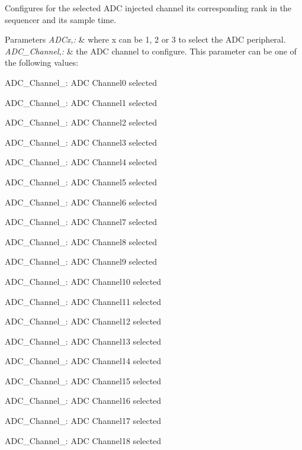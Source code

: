 Configures for the selected A\-D\-C injected channel its corresponding rank in the sequencer and its sample time. 


\begin{DoxyParams}{Parameters}
{\em A\-D\-Cx,\-:} & where x can be 1, 2 or 3 to select the A\-D\-C peripheral. \\
\hline
{\em A\-D\-C\-\_\-\-Channel,\-:} & the A\-D\-C channel to configure. This parameter can be one of the following values\-: \begin{DoxyItemize}
\item A\-D\-C\-\_\-\-Channel\-\_\-: A\-D\-C Channel0 selected \item A\-D\-C\-\_\-\-Channel\-\_\-: A\-D\-C Channel1 selected \item A\-D\-C\-\_\-\-Channel\-\_\-: A\-D\-C Channel2 selected \item A\-D\-C\-\_\-\-Channel\-\_\-: A\-D\-C Channel3 selected \item A\-D\-C\-\_\-\-Channel\-\_\-: A\-D\-C Channel4 selected \item A\-D\-C\-\_\-\-Channel\-\_\-: A\-D\-C Channel5 selected \item A\-D\-C\-\_\-\-Channel\-\_\-: A\-D\-C Channel6 selected \item A\-D\-C\-\_\-\-Channel\-\_\-: A\-D\-C Channel7 selected \item A\-D\-C\-\_\-\-Channel\-\_\-: A\-D\-C Channel8 selected \item A\-D\-C\-\_\-\-Channel\-\_\-: A\-D\-C Channel9 selected \item A\-D\-C\-\_\-\-Channel\-\_\-: A\-D\-C Channel10 selected \item A\-D\-C\-\_\-\-Channel\-\_\-: A\-D\-C Channel11 selected \item A\-D\-C\-\_\-\-Channel\-\_\-: A\-D\-C Channel12 selected \item A\-D\-C\-\_\-\-Channel\-\_\-: A\-D\-C Channel13 selected \item A\-D\-C\-\_\-\-Channel\-\_\-: A\-D\-C Channel14 selected \item A\-D\-C\-\_\-\-Channel\-\_\-: A\-D\-C Channel15 selected \item A\-D\-C\-\_\-\-Channel\-\_\-: A\-D\-C Channel16 selected \item A\-D\-C\-\_\-\-Channel\-\_\-: A\-D\-C Channel17 selected \item A\-D\-C\-\_\-\-Channel\-\_\-: A\-D\-C Channel18 selected \end{DoxyItemize}

\end{DoxyParams}
